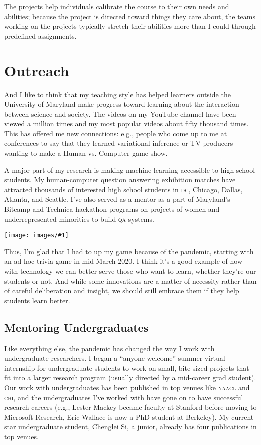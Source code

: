 \documentclass[11pt]{amsart}
\newcommand{\abr}[1]{\textsc{#1}}
\newcommand{\image}[2]{  \begin{center}
\texttt{[image: images/\#1]}
\end{center}
  }
\begin{document}
The projects help individuals calibrate the course to their own needs and abilities; because the project is directed toward things they care about, the teams working on the projects typically stretch their abilities more than I could through predefined assignments.  

\section{Outreach}

And I like to think that my teaching style has helped learners outside
the University of Maryland make progress toward learning about the
interaction between science and society.  The videos on my YouTube
channel have been viewed a million times and my most popular videos
about fifty thousand times.  This has offered me new connections:
e.g., people who come up to me at conferences to say that they learned
variational inference or TV producers wanting to make a Human
vs. Computer game show.

A major part of my research is making machine learning accessible to
high school students.
%
My human-computer question answering exhibition
matches have attracted thousands of interested high school students in
\abr{dc}, Chicago, Dallas, Atlanta, and Seattle.
%
I've also served as a mentor as a part of Maryland's Bitcamp and
Technica hackathon programs on projects of women and underrepresented
minorities to build \abr{qa} systems.

\image{atlanta_hsnct}{}

Thus, I’m glad that I had to up my game because of the pandemic, starting with an ad hoc trivia game in mid March 2020.  I think it’s a good example of how with technology we can better serve those who want to learn, whether they’re our students or not.  And while some innovations are a matter of necessity rather than of careful deliberation and insight, we should still embrace them if they help students learn better.

\subsection{Mentoring Undergraduates}

Like everything else, the pandemic has changed the way I work with
undergraduate researchers.
%
I began a ``anyone welcome'' summer virtual internship for
undergraduate students to work on small, bite-sized projects that fit
into a larger research program (usually directed by a mid-career grad
student).
%
Our work with undergraduates has been published in top
venues like \abr{naacl} and \abr{chi}, and the undergraduates I've worked with
have gone on to have successful research careers (e.g., Lester Mackey became
faculty at Stanford before moving to Microsoft Research, Eric Wallace is now a
PhD student at Berkeley).
%
My current star undergraduate student, Chenglei Si, a junior, already
has four publications in top venues.
\end{document}

